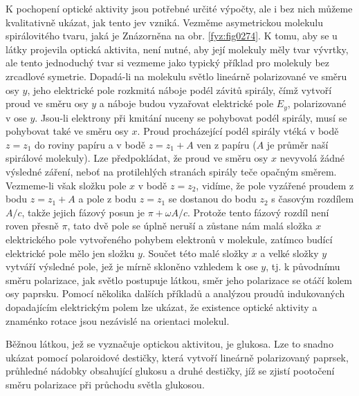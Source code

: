     K pochopení optické aktivity jsou potřebné určité výpočty, ale i bez nich můžeme kvalitativně
    ukázat, jak tento jev vzniká. Vezměme asymetrickou molekulu spirálovitého tvaru, jaká je
    Znázorněna na obr. \ref{fyz:fig0274}. K tomu, aby se u látky projevila optická aktivita, není
    nutné, aby její molekuly měly tvar vývrtky, ale tento jednoduchý tvar si vezmeme jako typický
    příklad pro molekuly bez zrcadlové symetrie. Dopadá-li na molekulu světlo lineárně polarizované
    ve směru osy \(y\), jeho elektrické pole rozkmitá náboje podél závitů spirály, čímž vytvoří
    proud ve směru osy \(y\) a náboje budou vyzařovat elektrické pole \(E_y\), polarizované v ose
    \(y\). Jsou-li elektrony při kmitání nuceny se pohybovat podél spirály, musí se pohybovat také
    ve směru osy \(x\). Proud procházející podél spirály vtéká v bodě \(z=z_1\) do roviny papíru a v
    bodě \(z=z_1 + A\) ven z papíru (\(A\) je průměr naší spirálové molekuly). Lze předpokládat, že
    proud ve směru osy \(x\) nevyvolá žádné výsledné záření, neboť na protilehlých stranách spirály
    teče opačným směrem. Vezmeme-li však složku pole \(x\) v bodě \(z=z_2\), vidíme, že pole
    vyzářené proudem z bodu \(z=z_1 + A\) a pole z bodu \(z=z_1\) se dostanou do bodu \(z_2\) s
    časovým rozdílem \(A/c\), takže jejich fázový posun je \(\pi + \omega A/c\). Protože tento
    fázový rozdíl není roven přesně \(\pi\), tato dvě pole se úplně neruší a zůstane nám malá složka
    \(x\) elektrického pole vytvořeného pohybem elektronů v molekule, zatímco budící elektrické pole
    mělo jen složku \(y\). Součet této malé složky \(x\) a velké složky \(y\) vytváří výsledné pole,
    jež je mírně skloněno vzhledem k ose \(y\), tj. k původnímu směru polarizace, jak světlo
    postupuje látkou, směr jeho polarizace se otáčí kolem osy paprsku. Pomocí několika dalších
    příkladů a analýzou proudů indukovaných dopadajícím elektrickým polem lze ukázat, že existence
    optické aktivity a znaménko rotace jsou nezávislé na orientaci molekul.

    Běžnou látkou, jež se vyznačuje optickou aktivitou, je glukosa. Lze to snadno ukázat pomocí
    polaroidové destičky, která vytvoří lineárně polarizovaný paprsek, průhledné nádobky obsahující
    glukosu a druhé destičky, jíž se zjistí pootočení směru polarizace při průchodu světla glukosou.

